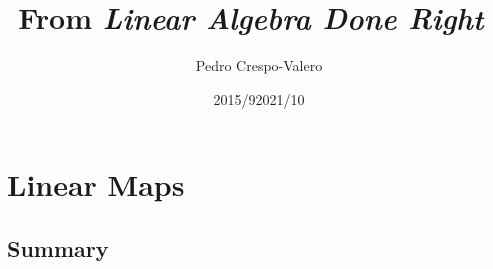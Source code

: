 \documentclass[11pt,notitlepage,oneside]{article}
\author{Pedro Crespo-Valero}
\begin{document}
\title{From \emph{Linear Algebra Done Right}~\cite{Axler1997}}
\date{2015/9}
\date{2021/10}
\maketitle

\tableofcontents

\newpage
\setcounter{section}{0}




\newpage
\section{Linear Maps}
\subsection*{Summary}
\end{document}
